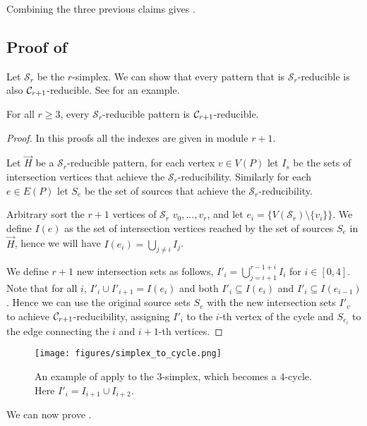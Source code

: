 \documentclass[a4paper,UKenglish,cleveref, autoref, numberwithinsect, thm-restate]{lipics-v2021}
\newcommand{\reducible}[1]{${#1}$-reducible}
\newcommand{\cycle}[1]{\cC_{#1}}
\newcommand{\simplex}[1]{\cS_{#1}}
\newcommand{\cC}{{\cal C}}
\newcommand{\cS}{\mathcal{S}}
\begin{document}
	Combining the three previous claims gives .
	
	\subsection{Proof of }
	
	Let $\simplex{r}$ be the $r$-simplex. We can show that every pattern that is \reducible{\simplex{r}} is also \reducible{\cycle{r+1}}. See  for an example.
	\begin{lemma} \label{lem:simplex}
		For all $r\geq 3$, every \reducible{\simplex{r}} pattern is \reducible{\cycle{r+1}}.
	\end{lemma}
	\begin{proof}
		In this proofs all the indexes are given in module $r+1$.
		
		Let $\vec{H}$ be a \reducible{\simplex{r}} pattern, for each vertex $v \in V(P)$ let $I_s$ be the sets of intersection vertices that achieve the $\simplex{r}$-reducibility. Similarly for each $e \in E(P)$ let $S_e$ be the set of sources that achieve the $\simplex{r}$-reducibility.
		
		Arbitrary sort the $r+1$ vertices of $\simplex{r}$ $v_0,...,v_{r}$, and let $e_i =\{V(\simplex{r})\setminus \{v_i\}\}$. We define $I(e)$ as the set of intersection vertices reached by the set of sources $S_e$ in $\vec{H}$, hence we will have $I(e_i) = \bigcup_{j\neq i} I_j$.
		
		We define $r+1$ new intersection sets as follows, $I'_i = \bigcup_{j=i+1}^{r-1+i} I_i$ for $i \in [0,4]$. Note that for all $i$, $I'_i \cup I'_{i+1} = I(e_i)$ and both $I'_i \subseteq I(e_i)$ and $I'_i \subseteq I(e_{i-1})$. Hence we can use the original source sets $S_e$ with the new intersection sets $I'_v$ to achieve $\cycle{r+1}$-reducibility, assigning $I'_i$ to the $i$-th vertex of the cycle and $S_{e_i}$ to the edge connecting the $i$ and $i+1$-th vertices.
	\end{proof}
	
	\begin{figure}
		\centering
		\texttt{[image: figures/simplex\_to\_cycle.png]}\caption{An example of apply  to the $3$-simplex, which becomes a $4$-cycle. Here $I'_i =  I_{i+1}\cup I_{i+2}$.}
		\label{fig:simplex}
	\end{figure}

	We can now prove .
	
\end{document}
